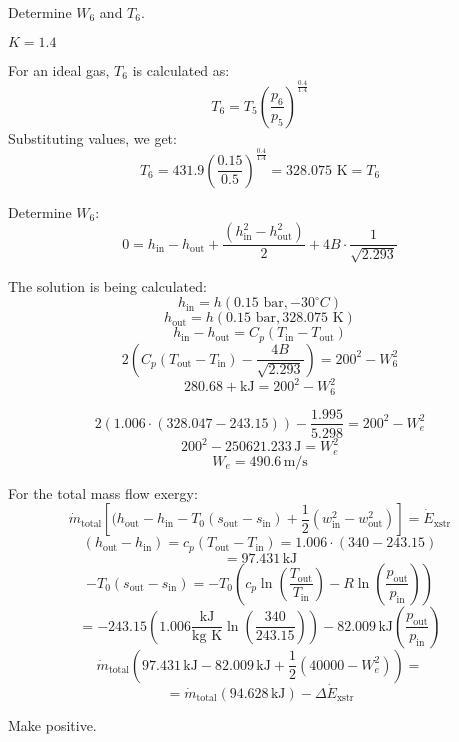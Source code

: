 Determine \( W_6 \) and \( T_6 \).

\( K = 1.4 \)

For an ideal gas, \( T_6 \) is calculated as:
\[ T_6 = T_5 \left( \frac{p_6}{p_5} \right)^{\frac{0.4}{1.4}} \]
Substituting values, we get:
\[ T_6 = 431.9 \left( \frac{0.15}{0.5} \right)^{\frac{0.4}{1.4}} = 328.075 \text{ K} = T_6 \]

Determine \( W_6 \):
\[ 0 = h_{\text{in}} - h_{\text{out}} + \frac{(h_{\text{in}}^2 - h_{\text{out}}^2)}{2} + 4B \cdot \frac{1}{\sqrt{2.293}} \]

The solution is being calculated:
\[ h_{\text{in}} = h(0.15 \text{ bar}, -30^\circ C) \]
\[ h_{\text{out}} = h(0.15 \text{ bar}, 328.075 \text{ K}) \]
\[ h_{\text{in}} - h_{\text{out}} = C_p (T_{\text{in}} - T_{\text{out}}) \]
\[ 2 \left( C_p (T_{\text{out}} - T_{\text{in}}) - \frac{4B}{\sqrt{2.293}} \right) = 200^2 - W_6^2 \]
\[ 280.68 + \text{kJ} = 200^2 - W_6^2 \]

\[ 2 \left( 1.006 \cdot (328.047 - 243.15) \right) - \frac{1.995}{5.298} = 200^2 - W_{e}^2 \]
\[ 200^2 - 250621.233 \, \text{J} = W_{e}^2 \]
\[ W_{e} = 490.6 \, \text{m/s} \]

For the total mass flow exergy:
\[ \dot{m}_{\text{total}} \left[ (h_{\text{out}} - h_{\text{in}} - T_0 (s_{\text{out}} - s_{\text{in}}) + \frac{1}{2} (w_{\text{in}}^2 - w_{\text{out}}^2) \right] = \dot{E}_{\text{xstr}} \]
\[ (h_{\text{out}} - h_{\text{in}}) = c_p (T_{\text{out}} - T_{\text{in}}) = 1.006 \cdot (340 - 243.15) \]
\[ = 97.431 \, \text{kJ} \]
\[ - T_0 (s_{\text{out}} - s_{\text{in}}) = - T_0 \left( c_p \ln \left( \frac{T_{\text{out}}}{T_{\text{in}}} \right) - R \ln \left( \frac{p_{\text{out}}}{p_{\text{in}}} \right) \right) \]
\[ = -243.15 \left( 1.006 \frac{\text{kJ}}{\text{kg K}} \ln \left( \frac{340}{243.15} \right) \right) - 82.009 \, \text{kJ} \left( \frac{p_{\text{out}}}{p_{\text{in}}} \right) \]
\[ \dot{m}_{\text{total}} \left( 97.431 \, \text{kJ} - 82.009 \, \text{kJ} + \frac{1}{2} \left( 40000 - W_{e}^2 \right) \right) = \]
\[ = \dot{m}_{\text{total}} \left( 94.628 \, \text{kJ} \right) - \Delta \dot{E}_{\text{xstr}} \]

Make positive.